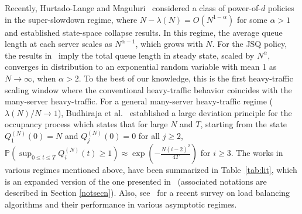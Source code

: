 \documentclass[11pt, reqno]{article}
\numberwithin{equation}{section}
\numberwithin{theorem}{section}
\begin{document}
Recently, Hurtado-Lange and Maguluri~\cite{HM20, HM21} considered a class of power-of-$d$ policies in the super-slowdown regime, where $N - \lambda(N) = O(N^{1-\alpha})$ for some $\alpha > 1$ and established state-space collapse results.
In this regime, the average queue length at each server scales as $N^{\alpha - 1}$, which grows with $N$.
For the JSQ policy, the results in~\cite{HM20, HM21} imply the total queue length in steady state, scaled by $N^{\alpha}$, converges in distribution to an exponential random variable with mean 1 as $N\to\infty$, when $\alpha>2$.
To the best of our knowledge, this is the first heavy-traffic scaling window where the conventional heavy-traffic behavior coincides with the many-server heavy-traffic.
For a general many-server heavy-traffic regime ($\lambda(N)/N\rightarrow1$), Budhiraja et al.~\cite{BFW19} established a large deviation principle for the occupancy process which states that for large $N$ and $T$,
starting from the state $Q^{(N)}_1(0)=N$ and $Q^{(N)}_j(0)=0$ for all $j\geq 2$,
$\mathbb{P}(\sup_{0\leq t\leq T} Q^{(N)}_i(t)\geq 1)\approx \exp (-\frac{N(i-2)^2}{4T})$ for $i\geq 3$.
The works in various regimes mentioned above, have been summarized in Table~\ref{tab:lit}, which is an expanded version of the one presented in~\cite{HM20} (associated notations are described in Section \ref{notsecn}).
Also, see~\cite{BBLM21} for a recent survey on load balancing algorithms and their performance in various asymptotic regimes.
\end{document}
